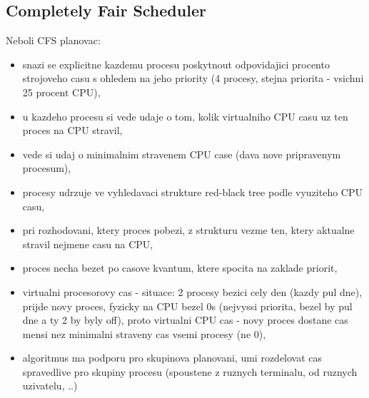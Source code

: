 \documentclass[a4paper, 11pt]{article}
\begin{document}
\subsection{Completely Fair Scheduler}
Neboli CFS planovac:
\begin{itemize}
    \item snazi se explicitne kazdemu procesu poskytnout odpovidajici procento strojoveho casu s ohledem na jeho priority (4 procesy, stejna priorita - vsichni 25 procent CPU),
    \item u kazdeho procesu si vede udaje o tom, kolik virtualniho CPU casu uz ten proces na CPU stravil,
    \item vede si udaj o minimalnim stravenem CPU case (dava nove pripravenym procesum),
    \item procesy udrzuje ve vyhledavaci strukture red-black tree podle vyuziteho CPU casu,
    \item pri rozhodovani, ktery proces pobezi, z strukturu vezme ten, ktery aktualne stravil nejmene casu na CPU,
    \item proces necha bezet po casove kvantum, ktere spocita na zaklade priorit,
    \item virtualni procesorovy cas - situace: 2 procesy bezici cely den (kazdy pul dne), prijde novy proces, fyzicky na CPU bezel 0s (nejvyssi priorita, bezel by pul dne a ty 2 by byly off), proto virtualni CPU cas - novy proces dostane cas mensi nez minimalni straveny cas vsemi procesy (ne 0),
    \item algoritmus ma podporu pro skupinova planovani, umi rozdelovat cas spravedlive pro skupiny procesu (spoustene z ruznych terminalu, od ruznych uzivatelu, ..) \\
\end{itemize}
\end{document}
